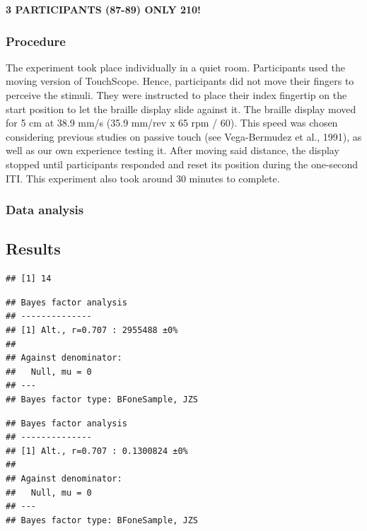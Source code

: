 \documentclass[english,man]{apa7}
\begin{document}
\textbf{3 PARTICIPANTS (87-89) ONLY 210!}

\hypertarget{procedure}{%
\subsubsection{Procedure}\label{procedure}}

The experiment took place individually in a quiet room. Participants used the moving version of TouchScope. Hence, participants did not move their fingers to perceive the stimuli. They were instructed to place their index fingertip on the start position to let the braille display slide against it. The braille display moved for 5 cm at 38.9 mm/s (35.9 mm/rev x 65 rpm / 60). This speed was chosen considering previous studies on passive touch (see Vega-Bermudez et al., 1991), as well as our own experience testing it. After moving said distance, the display stopped until participants responded and reset its position during the one-second ITI. This experiment also took around 30 minutes to complete.

\hypertarget{data-analysis}{%
\subsubsection{Data analysis}\label{data-analysis}}

\hypertarget{results}{%
\subsection{Results}\label{results}}

\begin{verbatim}
## [1] 14
\end{verbatim}

\begin{verbatim}
## Bayes factor analysis
## --------------
## [1] Alt., r=0.707 : 2955488 ±0%
## 
## Against denominator:
##   Null, mu = 0 
## ---
## Bayes factor type: BFoneSample, JZS
\end{verbatim}

\begin{verbatim}
## Bayes factor analysis
## --------------
## [1] Alt., r=0.707 : 0.1300824 ±0%
## 
## Against denominator:
##   Null, mu = 0 
## ---
## Bayes factor type: BFoneSample, JZS
\end{verbatim}
\end{document}
